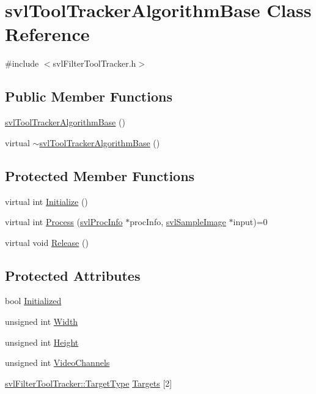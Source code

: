 \hypertarget{classsvl_tool_tracker_algorithm_base}{\section{svl\-Tool\-Tracker\-Algorithm\-Base Class Reference}
\label{classsvl_tool_tracker_algorithm_base}
}


{\ttfamily \#include $<$svl\-Filter\-Tool\-Tracker.\-h$>$}

\subsection*{Public Member Functions}
\begin{DoxyCompactItemize}
\item 
\hyperlink{classsvl_tool_tracker_algorithm_base_ad054f6bd0e301b328768d4c8ae0fbc1d}{svl\-Tool\-Tracker\-Algorithm\-Base} ()
\item 
virtual \hyperlink{classsvl_tool_tracker_algorithm_base_a12548bdb4e7c832f8fd58f7f479b8e43}{$\sim$svl\-Tool\-Tracker\-Algorithm\-Base} ()
\end{DoxyCompactItemize}
\subsection*{Protected Member Functions}
\begin{DoxyCompactItemize}
\item 
virtual int \hyperlink{classsvl_tool_tracker_algorithm_base_ae5d4343b1bd75046a72d4d1dfc1465d0}{Initialize} ()
\item 
virtual int \hyperlink{classsvl_tool_tracker_algorithm_base_acf0f8a43b15213ef72845fcac00fcabf}{Process} (\hyperlink{structsvl_proc_info}{svl\-Proc\-Info} $\ast$proc\-Info, \hyperlink{classsvl_sample_image}{svl\-Sample\-Image} $\ast$input)=0
\item 
virtual void \hyperlink{classsvl_tool_tracker_algorithm_base_afe6cd3bd32c80e292e9d64ffe7ce1716}{Release} ()
\end{DoxyCompactItemize}
\subsection*{Protected Attributes}
\begin{DoxyCompactItemize}
\item 
bool \hyperlink{classsvl_tool_tracker_algorithm_base_a6973e731afbdbcb7511b5db0366c4632}{Initialized}
\item 
unsigned int \hyperlink{classsvl_tool_tracker_algorithm_base_a5dc173e2176c626b0550a2b6d4ef8f93}{Width}
\item 
unsigned int \hyperlink{classsvl_tool_tracker_algorithm_base_a3715c7b38fb6c6ca74bcb880015dacd6}{Height}
\item 
unsigned int \hyperlink{classsvl_tool_tracker_algorithm_base_a9daba631208a063814d5401631af6d63}{Video\-Channels}
\item 
\hyperlink{classsvl_filter_tool_tracker_a3fe48b9f9a53caf0f5df9e96b1ccc38e}{svl\-Filter\-Tool\-Tracker\-::\-Target\-Type} \hyperlink{classsvl_tool_tracker_algorithm_base_a60811608667d44f5efc93eb6bedd4a90}{Targets} \mbox{[}2\mbox{]}
\end{DoxyCompactItemize}
